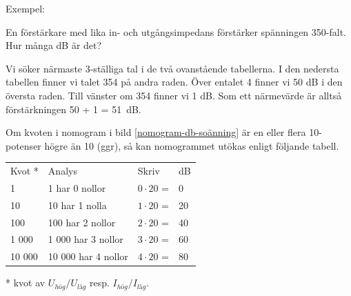 \begin{rev-raderas}

Exempel:

En förstärkare med lika in- och utgångsimpedans förstärker spänningen
350-falt.  Hur många dB är det?

Vi söker närmaste 3-ställiga tal i de två ovanstående tabellerna. I
den nedersta tabellen finner vi talet 354 på andra raden.  Över
entalet 4 finner vi 50 dB i den översta raden. Till vänster om 354
finner vi 1 dB.  Som ett närmevärde är alltså förstärkningen 50 + 1 =
51~dB.

Om kvoten i nomogram i bild \ref{nomogram-db-soänning} är en eller flera 10-potenser högre
än 10 (ggr), så kan nomogrammet utökas enligt följande tabell.

\begin{tabular}{llll}
  Kvot * & Analys              & Skriv           & dB \\
  1      & 1 har 0 nollor      & \(0 \cdot 20\) = & 0  \\
  10     & 10 har 1 nolla      & \(1 \cdot 20\) = & 20 \\
  100    & 100 har 2 nollor    & \(2 \cdot 20\) = & 40 \\
  1 000  & 1 000 har 3 nollor  & \(3 \cdot 20\) = & 60 \\
  10 000 & 10 000 har 4 nollor & \(4 \cdot 20\) = & 80 \\
\end{tabular}

* kvot av \(U_{hög}/U_{låg}\) resp. \(I_{hög}/I_{låg}\).


\end{rev-raderas}
